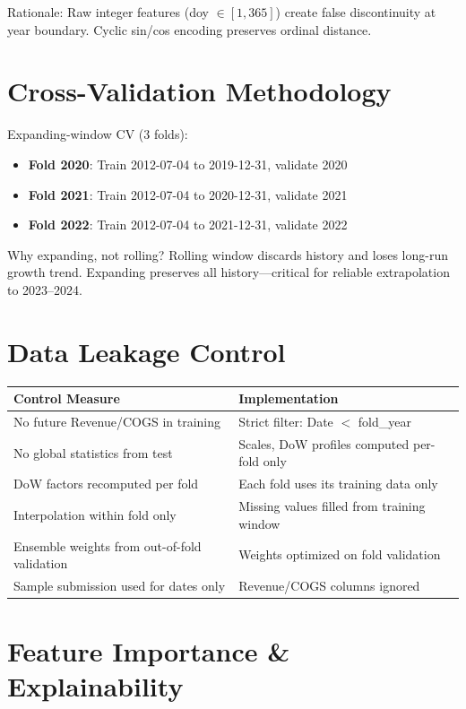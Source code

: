 \documentclass[12pt,a4paper]{article}
\begin{document}
Rationale: Raw integer features (doy $\in [1,365]$) create false discontinuity at year boundary. Cyclic sin/cos encoding preserves ordinal distance.

\section{Cross-Validation Methodology}

Expanding-window CV (3 folds):
\begin{itemize}
  \item \textbf{Fold 2020}: Train 2012-07-04 to 2019-12-31, validate 2020
  \item \textbf{Fold 2021}: Train 2012-07-04 to 2020-12-31, validate 2021
  \item \textbf{Fold 2022}: Train 2012-07-04 to 2021-12-31, validate 2022
\end{itemize}

Why expanding, not rolling? Rolling window discards history and loses long-run growth trend. Expanding preserves all history—critical for reliable extrapolation to 2023--2024.

\section{Data Leakage Control}

\begin{table}[h!]
\centering
\small
\begin{tabular}{p{3.5cm}p{7cm}}
\toprule
\textbf{Control Measure} & \textbf{Implementation} \\
\midrule
No future Revenue/COGS in training & Strict filter: Date $<$ fold\_year \\
No global statistics from test & Scales, DoW profiles computed per-fold only \\
DoW factors recomputed per fold & Each fold uses its training data only \\
Interpolation within fold only & Missing values filled from training window \\
Ensemble weights from out-of-fold validation & Weights optimized on fold validation \\
Sample submission used for dates only & Revenue/COGS columns ignored \\
\bottomrule
\end{tabular}
\end{table}

\section{Feature Importance \& Explainability}
\end{document}
